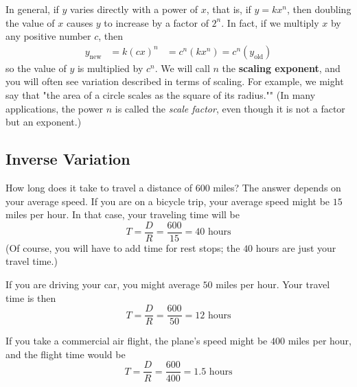 \documentclass[10pt,]{book}
\newcommand{\terminology}[1]{\textbf{#1}}
\theoremstyle{plain}
\theoremstyle{definition}
\theoremstyle{definition}
\theoremstyle{definition}
\theoremstyle{definition}
\theoremstyle{definition}
\numberwithin{equation}{section}
\newcommand{\amp}{ & }
\begin{document}
	In general, if \(y\) varies directly with a power of \(x\), that is, if \(y = kx^n\), then doubling the value of \(x\) causes \(y\) to increase by a factor of \(2^n\). In fact, if we multiply \(x\) by any positive number \(c\), then
	\begin{equation*}
		\begin{aligned}
		y_\text{new} \amp =k(cx)^n
		\amp =c^n(kx^n) = c^n(y_\text{old})
		\end{aligned}
	\end{equation*}
	so the value of \(y\) is multiplied by \(c^n\). We will call \(n\) the \terminology{scaling exponent}, and you will often see variation described in terms of scaling. For example, we might say that "the area of a circle scales as the square of its radius."" (In many applications, the power \(n\) is called the \emph{scale factor}, even though it is not a factor but an exponent.)
%
\typeout{************************************************}
\typeout{************************************************}
\subsection[Inverse Variation]{Inverse Variation}\label{subsection-61}
\index{}
	How long does it take to travel a distance of \(600\) miles? The answer depends on your average speed. If you are on a bicycle trip, your average speed might be \(15\) miles per hour. In that case, your traveling time will be
	\begin{equation*}T = \frac{D}{R}= \frac{600}{15}= 40 \text{ hours}\end{equation*}
	(Of course, you will have to add time for rest stops; the \(40\) hours are just your travel time.) 
%
\par

	If you are driving your car, you might average \(50\) miles per hour. Your travel time is then
	\begin{equation*}T = \frac{D}{R}= \frac{600}{50}= 12 \text{ hours}\end{equation*}
%
\par

	If you take a commercial air flight, the plane’s speed might be \(400\) miles per hour, and the flight time would be
	\begin{equation*}T = \frac{D}{R}= \frac{600}{400}= 1.5 \text{ hours}\end{equation*}
%
\par
\end{document}
